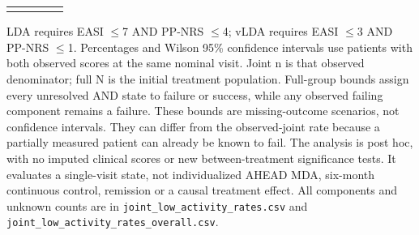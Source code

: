 {\begin{longtable}{p{24mm}rp{20mm}p{50mm}p{50mm}}
\addlinespace
\bottomrule\end{longtable}
LDA requires EASI $\leq$7 AND PP-NRS $\leq$4; vLDA requires EASI $\leq$3 AND PP-NRS $\leq$1. Percentages and Wilson 95\% confidence intervals use patients with both observed scores at the same nominal visit. Joint n is that observed denominator; full N is the initial treatment population. Full-group bounds assign every unresolved AND state to failure or success, while any observed failing component remains a failure. These bounds are missing-outcome scenarios, not confidence intervals. They can differ from the observed-joint rate because a partially measured patient can already be known to fail. The analysis is post hoc, with no imputed clinical scores or new between-treatment significance tests. It evaluates a single-visit state, not individualized AHEAD MDA, six-month continuous control, remission or a causal treatment effect. All components and unknown counts are in \texttt{joint\_low\_activity\_rates.csv} and \texttt{joint\_low\_activity\_rates\_overall.csv}.
}
